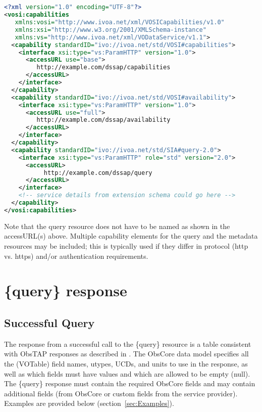 \documentclass[11pt,a4paper]{ivoa}
\begin{document}
\begin{lstlisting}[language=XML]


<?xml version="1.0" encoding="UTF-8"?>
<vosi:capabilities 
   xmlns:vosi="http://www.ivoa.net/xml/VOSICapabilities/v1.0" 
   xmlns:xsi="http://www.w3.org/2001/XMLSchema-instance" 
   xmlns:vs="http://www.ivoa.net/xml/VODataService/v1.1">
  <capability standardID="ivo://ivoa.net/std/VOSI#capabilities">
    <interface xsi:type="vs:ParamHTTP" version="1.0">
      <accessURL use="base">
         http://example.com/dssap/capabilities
      </accessURL>
    </interface>
  </capability>
  <capability standardID="ivo://ivoa.net/std/VOSI#availability">
    <interface xsi:type="vs:ParamHTTP" version="1.0">
      <accessURL use="full">
         http://example.com/dssap/availability
      </accessURL>
    </interface>
  </capability>
  <capability standardID="ivo://ivoa.net/std/SIA#query-2.0">
    <interface xsi:type="vs:ParamHTTP" role="std" version="2.0">
      <accessURL>
           http://example.com/dssap/query
      </accessURL>
    </interface>
    <!-- service details from extension schema could go here -->
  </capability>
</vosi:capabilities>
\end{lstlisting}

Note that the {query} resource does not have to be named as shown in the accessURL(s) above. Multiple capability elements for the {query} and the {metadata} resources may be included; this is typically used if they differ in protocol (http vs. https) and/or authentication requirements.

\section{\{query\} response}
\label{sec:queryresponse}

\subsection{Successful Query}
\label{sec:succesful}

The response from a successful call to the \{query\} resource is a table consistent with  ObsTAP responses as described in \cite{std:OBSCORE}. The ObsCore data model specifies all the (VOTable) field names, utypes, UCDs, and units to use in the response, as well as which fields must have values and which are allowed to be empty (null). The \{query\} response must contain the required ObsCore fields and may contain additional fields (from ObsCore or custom fields from the service provider). Examples are provided below (section~\ref{sec:Examples}).
\end{document}

